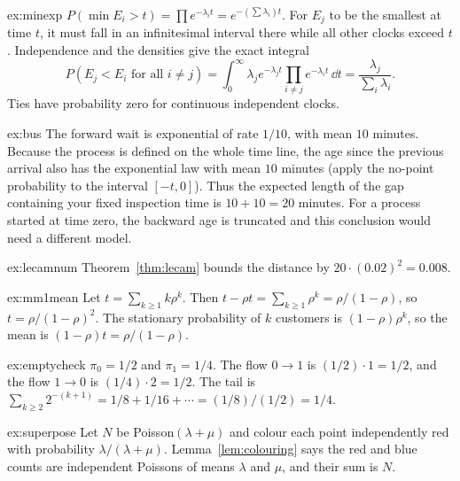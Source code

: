 \begin{solution}{ex:minexp}
\writeup $P(\min E_i>t)=\prod e^{-\lambda_i t}=e^{-(\sum\lambda_i)t}$. For $E_j$ to be the smallest at time $t$, it must fall in an infinitesimal interval there while all other clocks exceed $t$. Independence and the densities give the exact integral
\[
P(E_j<E_i\text{ for all }i\ne j)=\int_0^\infty\lambda_j e^{-\lambda_j t}\prod_{i\ne j}e^{-\lambda_i t}\,\dd t
=\frac{\lambda_j}{\sum_i\lambda_i}.
\]
Ties have probability zero for continuous independent clocks.
\end{solution}

\begin{solution}{ex:bus}
\writeup The forward wait is exponential of rate $1/10$, with mean $10$ minutes. Because the process is defined on the whole time line, the age since the previous arrival also has the exponential law with mean $10$ minutes (apply the no-point probability to the interval $[-t,0]$). Thus the expected length of the gap containing your fixed inspection time is $10+10=20$ minutes. For a process started at time zero, the backward age is truncated and this conclusion would need a different model.
\end{solution}

\begin{solution}{ex:lecamnum}
\writeup Theorem~\ref{thm:lecam} bounds the distance by $20\cdot(0.02)^2=0.008$.
\end{solution}

\begin{solution}{ex:mm1mean}
\writeup Let $t=\sum_{k\ge1}k\rho^k$. Then $t-\rho t=\sum_{k\ge1}\rho^k=\rho/(1-\rho)$, so $t=\rho/(1-\rho)^2$. The stationary probability of $k$ customers is $(1-\rho)\rho^k$, so the mean is $(1-\rho)t=\rho/(1-\rho)$.
\end{solution}

\begin{solution}{ex:emptycheck}
\writeup $\pi_0=1/2$ and $\pi_1=1/4$. The flow $0\to1$ is $(1/2)\cdot1=1/2$, and the flow $1\to0$ is $(1/4)\cdot2=1/2$. The tail is $\sum_{k\ge2}2^{-(k+1)}=1/8+1/16+\cdots=(1/8)/(1/2)=1/4$.
\end{solution}

\begin{solution}{ex:superpose}
\writeup Let $N$ be Poisson$(\lambda+\mu)$ and colour each point independently red with probability $\lambda/(\lambda+\mu)$. Lemma~\ref{lem:colouring} says the red and blue counts are independent Poissons of means $\lambda$ and $\mu$, and their sum is $N$.
\end{solution}

